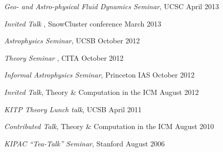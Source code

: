 \begin{talkenum}
\item \textit{Geo- and Astro-physical Fluid Dynamics Seminar}, UCSC \hspace*{\fill} April 2013

\item \textit{Invited Talk }, SnowCluster conference \hspace*{\fill} March 2013

\item \textit{Astrophysics Seminar}, UCSB \hspace*{\fill} October 2012

\item \textit{Theory Seminar }, CITA  \hspace*{\fill} October 2012

\item \textit{Informal Astrophysics Seminar}, Princeton IAS \hspace*{\fill} October 2012

\item \textit{Invited Talk}, Theory \& Computation in the ICM \hspace*{\fill} August 2012

\item \textit{KITP Theory Lunch talk}, UCSB \hspace*{\fill} April 2011

\item \textit{Contributed Talk}, Theory \& Computation in the ICM \hspace*{\fill} August 2010

\item \textit{KIPAC “Tea-Talk” Seminar}, Stanford \hspace*{\fill} August 2006

\end{talkenum}
